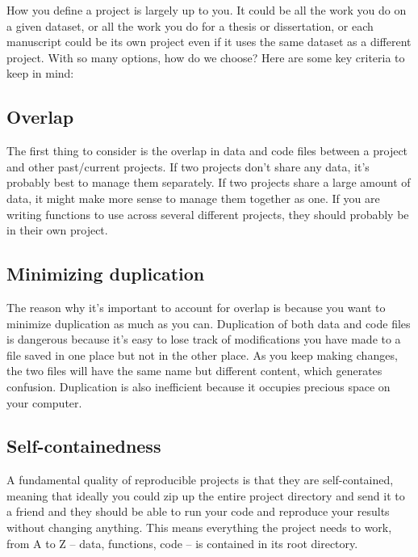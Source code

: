 \documentclass[
]{book}
\begin{document}
How you define a project is largely up to you. It could be all the work you do on a given dataset, or all the work you do for a thesis or dissertation, or each manuscript could be its own project even if it uses the same dataset as a different project. With so many options, how do we choose? Here are some key criteria to keep in mind:

\hypertarget{overlap}{%
\subsection{Overlap}\label{overlap}}

The first thing to consider is the overlap in data and code files between a project and other past/current projects. If two projects don't share any data, it's probably best to manage them separately. If two projects share a large amount of data, it might make more sense to manage them together as one. If you are writing functions to use across several different projects, they should probably be in their own project.

\hypertarget{minimizing-duplication}{%
\subsection{Minimizing duplication}\label{minimizing-duplication}}

The reason why it's important to account for overlap is because you want to minimize duplication as much as you can. Duplication of both data and code files is dangerous because it's easy to lose track of modifications you have made to a file saved in one place but not in the other place. As you keep making changes, the two files will have the same name but different content, which generates confusion. Duplication is also inefficient because it occupies precious space on your computer.

\hypertarget{self-containedness}{%
\subsection{Self-containedness}\label{self-containedness}}

A fundamental quality of reproducible projects is that they are self-contained, meaning that ideally you could zip up the entire project directory and send it to a friend and they should be able to run your code and reproduce your results without changing anything. This means everything the project needs to work, from A to Z -- data, functions, code -- is contained in its root directory.
\end{document}
